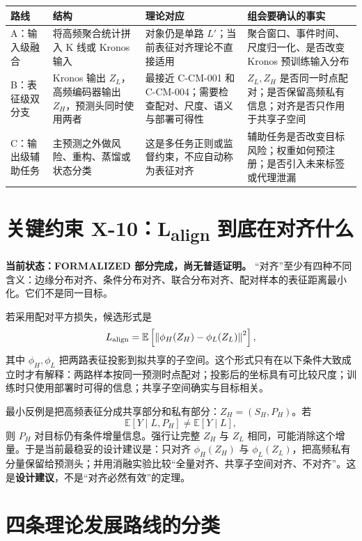\documentclass[UTF8,11pt,a4paper]{ctexart}
\newcommand{\E}{\mathbb E}
\begin{document}
\begin{longtable}{p{}p{}p{}p{}}
\toprule
路线 & 结构 & 理论对应 & 组会要确认的事实\\
\midrule
A：输入级融合 & 将高频聚合统计拼入 K 线或 Kronos 输入 & 对象仍是单路 $L'$；当前表征对齐理论不直接适用 & 聚合窗口、事件时间、尺度归一化、是否改变 Kronos 预训练输入分布\\
B：表征级双分支 & Kronos 输出 $Z_L$，高频编码器输出 $Z_H$，预测头同时使用两者 & 最接近 C-CM-001 和 C-CM-004；需要检查配对、尺度、语义与部署可得性 & $Z_L,Z_H$ 是否同一时点配对；是否保留高频私有信息；对齐是否只作用于共享子空间\\
C：输出级辅助任务 & 主预测之外做风险、重构、蒸馏或状态分类 & 这是多任务正则或监督约束，不应自动称为表征对齐 & 辅助任务是否改变目标风险；权重如何预注册；是否引入未来标签或代理泄漏\\
\bottomrule
\end{longtable}

\section{关键约束 X-10：L\textsubscript{align} 到底在对齐什么}

\textbf{当前状态：FORMALIZED 部分完成，尚无普适证明。} “对齐”至少有四种不同含义：边缘分布对齐、条件分布对齐、联合分布对齐、配对样本的表征距离最小化。它们不是同一目标。

若采用配对平方损失，候选形式是
\[
 L_{\rm align}=\E\left[\left\|\phi_H(Z_H)-\phi_L(Z_L)\right\|^2\right],
\]
其中 $\phi_H,\phi_L$ 把两路表征投影到拟共享的子空间。这个形式只有在以下条件大致成立时才有解释：两路样本按同一预测时点配对；投影后的坐标具有可比较尺度；训练时只使用部署时可得的信息；共享子空间确实与目标相关。

最小反例是把高频表征分成共享部分和私有部分：$Z_H=(S_H,P_H)$。若
\[
 \E[Y\mid L,P_H]\ne \E[Y\mid L],
\]
则 $P_H$ 对目标仍有条件增量信息。强行让完整 $Z_H$ 与 $Z_L$ 相同，可能消除这个增量。于是当前最稳妥的设计建议是：只对齐 $\phi_H(Z_H)$ 与 $\phi_L(Z_L)$，把高频私有分量保留给预测头；并用消融实验比较“全量对齐、共享子空间对齐、不对齐”。这是\textbf{设计建议}，不是“对齐必然有效”的定理。

\section{四条理论发展路线的分类}
\end{document}
